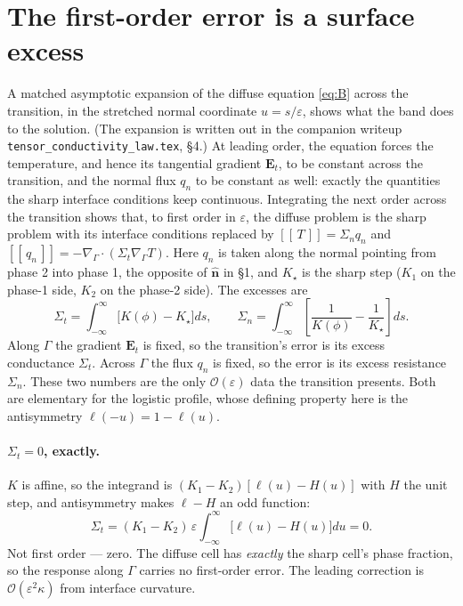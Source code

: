 \documentclass[11pt]{article}
\newcommand{\Gam}{\Gamma}
\newcommand{\bn}{\hat{\mathbf n}}
\newcommand{\jump}[1]{[\![\,#1\,]\!]}
\begin{document}
\section{The first-order error is a surface excess}
\label{sec:excess}

A matched asymptotic expansion of the diffuse equation \eqref{eq:B} across the
transition, in the stretched normal coordinate $u=s/\varepsilon$, shows what the
band does to the solution. (The expansion is written out in the companion
writeup \verb|tensor_conductivity_law.tex|, \S4.) At leading order, the
equation forces the temperature, and hence its tangential gradient
$\mathbf E_t$, to be constant across the transition, and the normal flux $q_n$
to be constant as well: exactly the quantities the sharp interface conditions
keep continuous. Integrating the next order across the transition shows that,
to first order in $\varepsilon$, the diffuse problem is the sharp problem with
its interface conditions replaced by
$\jump{T}=\Sigma_n q_n$ and $\jump{q_n}=-\nabla_\Gam\!\cdot(\Sigma_t\nabla_\Gam T)$.
Here $q_n$ is taken along the normal pointing from phase 2 into phase 1, the
opposite of $\bn$ in \S1, and $K_\star$ is the sharp step ($K_1$ on the phase-1
side, $K_2$ on the phase-2 side). The excesses are
\begin{equation}
\Sigma_t=\int_{-\infty}^{\infty}\!\big[K(\phi)-K_\star\big]ds,
\qquad
\Sigma_n=\int_{-\infty}^{\infty}\!\left[\frac{1}{K(\phi)}-\frac{1}{K_\star}\right]ds.
\label{eq:excess}
\end{equation}
Along $\Gam$ the gradient $\mathbf E_t$ is fixed, so the transition's error is
its excess conductance $\Sigma_t$. Across $\Gam$ the flux $q_n$ is fixed, so the
error is its excess resistance $\Sigma_n$. These two numbers are the only
$\mathcal O(\varepsilon)$ data the transition presents. Both are elementary for
the logistic profile, whose defining property here is the antisymmetry
$\ell(-u)=1-\ell(u)$.

\paragraph{$\Sigma_t=0$, exactly.} $K$ is affine, so the integrand is
$(K_1-K_2)[\ell(u)-H(u)]$ with $H$ the unit step, and antisymmetry makes
$\ell-H$ an odd function:
\begin{equation}
\Sigma_t=(K_1-K_2)\,\varepsilon\!\int_{-\infty}^{\infty}\!\big[\ell(u)-H(u)\big]du=0 .
\label{eq:sigmat}
\end{equation}
Not first order --- zero. The diffuse cell has \emph{exactly} the sharp cell's
phase fraction, so the response along $\Gam$ carries no first-order error.
The leading correction is $\mathcal O(\varepsilon^2\kappa)$ from interface
curvature.
\end{document}
